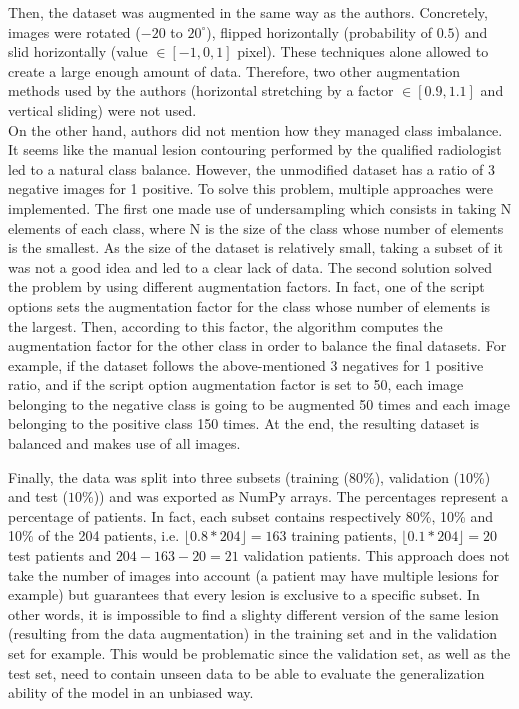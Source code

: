 Then, the dataset was augmented in the same way as the authors. Concretely, images were rotated ($-20$ to $20^\circ$), flipped horizontally (probability of $0.5$) and slid horizontally (value $\in [-1, 0, 1]$ pixel). These techniques alone allowed to create a large enough amount of data. Therefore, two other augmentation methods used by the authors (horizontal stretching by a factor $\in [0.9,1.1]$ and vertical sliding) were not used.\\
On the other hand, authors did not mention how they managed class imbalance. It seems like the manual lesion contouring performed by the qualified radiologist led to a natural class balance. However, the unmodified dataset has a ratio of 3 negative images for 1 positive. To solve this problem, multiple approaches were implemented. The first one made use of undersampling which consists in taking N elements of each class, where N is the size of the class whose number of elements is the smallest. As the size of the dataset is relatively small, taking a subset of it was not a good idea and led to a clear lack of data. The second solution solved the problem by using different augmentation factors. In fact, one of the script options sets the augmentation factor for the class whose number of elements is the largest. Then, according to this factor, the algorithm computes the augmentation factor for the other class in order to balance the final datasets. For example, if the dataset follows the above-mentioned 3 negatives for 1 positive ratio, and if the script option augmentation factor is set to 50, each image belonging to the negative class is going to be augmented 50 times and each image belonging to the positive class 150 times. At the end, the resulting dataset is balanced and makes use of all images. 

Finally, the data was split into three subsets (training ($80$\%), validation ($10$\%) and test ($10$\%)) and was exported as NumPy arrays. The percentages represent a percentage of patients. In fact, each subset contains respectively 80\%, 10\% and 10\% of the 204 patients, i.e. $\lfloor 0.8 * 204 \rfloor = 163$ training patients, $\lfloor 0.1 * 204 \rfloor = 20$ test patients and $204 - 163 - 20 = 21$ validation patients. This approach does not take the number of images into account (a patient may have multiple lesions for example) but guarantees that every lesion is exclusive to a specific subset. In other words, it is impossible to find a slighty different version of the same lesion (resulting from the data augmentation) in the training set and in the validation set for example. This would be problematic since the validation set, as well as the test set, need to contain unseen data to be able to evaluate the generalization ability of the model in an unbiased way. 


